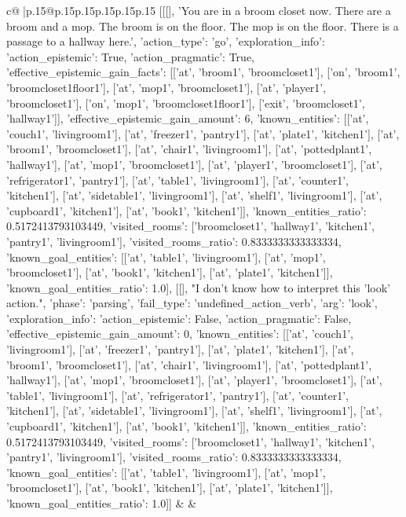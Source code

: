 \documentclass{article}
\begin{document}
{\begin{supertabular}{c@{$\;$}|p{.15\linewidth}@{}p{.15\linewidth}p{.15\linewidth}p{.15\linewidth}p{.15\linewidth}p{.15\linewidth}}
{{{	 [[[], 'You are in a broom closet now. There are a broom and a mop. The broom is on the floor. The mop is on the floor. There is a passage to a hallway here.', {'action_type': 'go', 'exploration_info': {'action_epistemic': True, 'action_pragmatic': True, 'effective_epistemic_gain_facts': [['at', 'broom1', 'broomcloset1'], ['on', 'broom1', 'broomcloset1floor1'], ['at', 'mop1', 'broomcloset1'], ['at', 'player1', 'broomcloset1'], ['on', 'mop1', 'broomcloset1floor1'], ['exit', 'broomcloset1', 'hallway1']], 'effective_epistemic_gain_amount': 6, 'known_entities': [['at', 'couch1', 'livingroom1'], ['at', 'freezer1', 'pantry1'], ['at', 'plate1', 'kitchen1'], ['at', 'broom1', 'broomcloset1'], ['at', 'chair1', 'livingroom1'], ['at', 'pottedplant1', 'hallway1'], ['at', 'mop1', 'broomcloset1'], ['at', 'player1', 'broomcloset1'], ['at', 'refrigerator1', 'pantry1'], ['at', 'table1', 'livingroom1'], ['at', 'counter1', 'kitchen1'], ['at', 'sidetable1', 'livingroom1'], ['at', 'shelf1', 'livingroom1'], ['at', 'cupboard1', 'kitchen1'], ['at', 'book1', 'kitchen1']], 'known_entities_ratio': 0.5172413793103449, 'visited_rooms': ['broomcloset1', 'hallway1', 'kitchen1', 'pantry1', 'livingroom1'], 'visited_rooms_ratio': 0.8333333333333334, 'known_goal_entities': [['at', 'table1', 'livingroom1'], ['at', 'mop1', 'broomcloset1'], ['at', 'book1', 'kitchen1'], ['at', 'plate1', 'kitchen1']], 'known_goal_entities_ratio': 1.0}}], [[], "I don't know how to interpret this 'look' action.", {'phase': 'parsing', 'fail_type': 'undefined_action_verb', 'arg': 'look', 'exploration_info': {'action_epistemic': False, 'action_pragmatic': False, 'effective_epistemic_gain_amount': 0, 'known_entities': [['at', 'couch1', 'livingroom1'], ['at', 'freezer1', 'pantry1'], ['at', 'plate1', 'kitchen1'], ['at', 'broom1', 'broomcloset1'], ['at', 'chair1', 'livingroom1'], ['at', 'pottedplant1', 'hallway1'], ['at', 'mop1', 'broomcloset1'], ['at', 'player1', 'broomcloset1'], ['at', 'table1', 'livingroom1'], ['at', 'refrigerator1', 'pantry1'], ['at', 'counter1', 'kitchen1'], ['at', 'sidetable1', 'livingroom1'], ['at', 'shelf1', 'livingroom1'], ['at', 'cupboard1', 'kitchen1'], ['at', 'book1', 'kitchen1']], 'known_entities_ratio': 0.5172413793103449, 'visited_rooms': ['broomcloset1', 'hallway1', 'kitchen1', 'pantry1', 'livingroom1'], 'visited_rooms_ratio': 0.8333333333333334, 'known_goal_entities': [['at', 'table1', 'livingroom1'], ['at', 'mop1', 'broomcloset1'], ['at', 'book1', 'kitchen1'], ['at', 'plate1', 'kitchen1']], 'known_goal_entities_ratio': 1.0}}]] 
	  } 
	   } 
	   } 
	 & & \\ 
 


\end{supertabular}}
\end{document}
